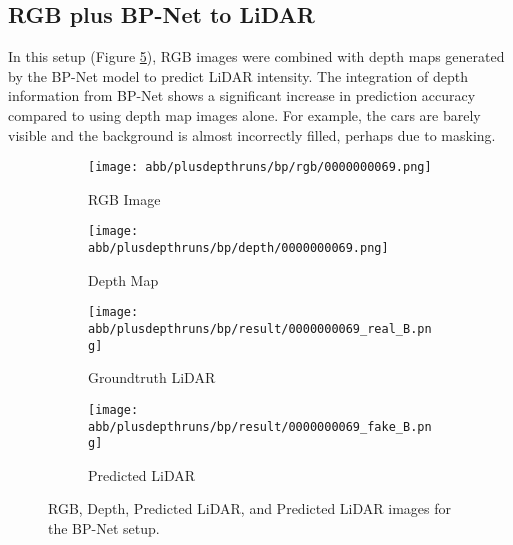 \subsection{RGB plus BP-Net to LiDAR}
In this setup (Figure \ref{bp_rgbd}), RGB images were combined with depth maps generated by the BP-Net model to predict LiDAR intensity. The integration of depth information from BP-Net shows a significant increase in prediction accuracy compared to using depth map images alone. For example, the cars are barely visible and the background is almost incorrectly filled, perhaps due to masking.
\begin{figure}[!ht]
	\centering
	\begin{subfigure}{0.4\textwidth}
		\centering
		\texttt{[image: abb/plusdepthruns/bp/rgb/0000000069.png]}
		\caption{RGB Image}
		\label{bp_rgbd1}
	\end{subfigure}
	
	\vspace{1em} %
	
	\begin{subfigure}{0.4\textwidth}
		\centering
		\texttt{[image: abb/plusdepthruns/bp/depth/0000000069.png]}
		\caption{Depth Map}
		\label{bp_rgbd2}
	\end{subfigure}
	
	\vspace{1em} %
	
	\begin{subfigure}{0.25\textwidth}
		\centering
		\texttt{[image: abb/plusdepthruns/bp/result/0000000069\_real\_B.png]}
		\caption{Groundtruth LiDAR}
		\label{fig:bp_pred_lidar}
	\end{subfigure}
	\begin{subfigure}{0.25\textwidth}
		\centering
		\texttt{[image: abb/plusdepthruns/bp/result/0000000069\_fake\_B.png]}
		\caption{Predicted LiDAR}
		\label{fig:bp_fake_lidar}
	\end{subfigure}
	
	\caption{RGB, Depth, Predicted LiDAR, and Predicted LiDAR images for the BP-Net setup.}
	\label{bp_rgbd}
\end{figure}
\newpage
